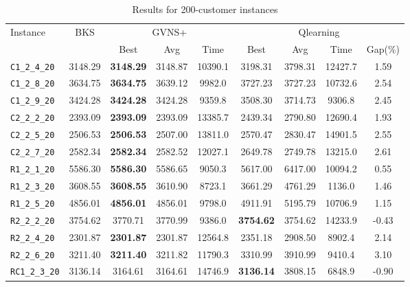 \begin{table}[ht]
\centering
\small
\setlength{\tabcolsep}{5pt}
\caption{Results for 200-customer instances}
\vspace{4mm}
\begin{adjustbox}{width=\textwidth}
\begin{tabular}{l c c c c @{\hspace{8pt}} c c c c @{\hspace{8pt}}}
\toprule
\multirow{2}{*}{Instance} & \multirow{2}{*}{BKS} & \multicolumn{3}{c}{GVNS+} & \multicolumn{4}{c}{Qlearning} \\
\cmidrule(lr){3-5} \cmidrule(lr){6-9}
 &  & Best & Avg & Time & Best & Avg & Time & Gap(\%) \\
\midrule
\texttt{C1\_2\_4\_20} & 3148.29 & \textbf{3148.29} & 3148.87 & 10390.1 & 3198.31 & 3798.31 & 12427.7 & 1.59 \\
\texttt{C1\_2\_8\_20} & 3634.75 & \textbf{3634.75} & 3639.12 & 9982.0 & 3727.23 & 3727.23 & 10732.6 & 2.54 \\
\texttt{C1\_2\_9\_20} & 3424.28 & \textbf{3424.28} & 3424.28 & 9359.8 & 3508.30 & 3714.73 & 9306.8 & 2.45 \\
\texttt{C2\_2\_2\_20} & 2393.09 & \textbf{2393.09} & 2393.09 & 13385.7 & 2439.34 & 2790.80 & 12690.4 & 1.93 \\
\texttt{C2\_2\_5\_20} & 2506.53 & \textbf{2506.53} & 2507.00 & 13811.0 & 2570.47 & 2830.47 & 14901.5 & 2.55 \\
\texttt{C2\_2\_7\_20} & 2582.34 & \textbf{2582.34} & 2582.52 & 12027.1 & 2649.78 & 2749.78 & 13215.0 & 2.61 \\
\texttt{R1\_2\_1\_20} & 5586.30 & \textbf{5586.30} & 5586.65 & 9050.3 & 5617.00 & 6417.00 & 10094.2 & 0.55 \\
\texttt{R1\_2\_3\_20} & 3608.55 & \textbf{3608.55} & 3610.90 & 8723.1 & 3661.29 & 4761.29 & 1136.0 & 1.46 \\
\texttt{R1\_2\_5\_20} & 4856.01 & \textbf{4856.01} & 4856.01 & 9798.0 & 4911.91 & 5195.79 & 10706.9 & 1.15 \\
\texttt{R2\_2\_2\_20} & 3754.62 & 3770.71 & 3770.99 & 9386.0 & \textbf{3754.62} & 3754.62 & 14233.9 & -0.43 \\
\texttt{R2\_2\_4\_20} & 2301.87 & \textbf{2301.87} & 2301.87 & 12564.8 & 2351.18 & 2908.50 & 8902.4 & 2.14 \\
\texttt{R2\_2\_6\_20} & 3211.40 & \textbf{3211.40} & 3211.82 & 11790.3 & 3310.99 & 3910.99 & 9410.4 & 3.10 \\
\texttt{RC1\_2\_3\_20} & 3136.14 & 3164.61 & 3164.61 & 14746.9 & \textbf{3136.14} & 3808.15 & 6848.9 & -0.90 \\

\end{tabular}
\end{adjustbox}
\end{table}

